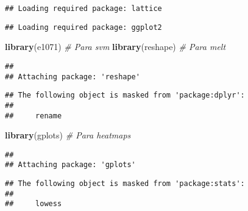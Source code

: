\documentclass[
]{article}
\newenvironment{Shaded}{\begin{snugshade}}{\end{snugshade}}
\newcommand{\CommentTok}[1]{\textcolor[rgb]{0.56,0.35,0.01}{\textit{#1}}}
\newcommand{\KeywordTok}[1]{\textcolor[rgb]{0.13,0.29,0.53}{\textbf{#1}}}
\newcommand{\NormalTok}[1]{#1}
\begin{document}
\begin{verbatim}
## Loading required package: lattice
\end{verbatim}

\begin{verbatim}
## Loading required package: ggplot2
\end{verbatim}

\begin{Shaded}
\begin{Highlighting}[]
\KeywordTok{library}\NormalTok{(e1071)       }\CommentTok{# Para svm}
\KeywordTok{library}\NormalTok{(reshape)     }\CommentTok{# Para melt}
\end{Highlighting}
\end{Shaded}

\begin{verbatim}
## 
## Attaching package: 'reshape'
\end{verbatim}

\begin{verbatim}
## The following object is masked from 'package:dplyr':
## 
##     rename
\end{verbatim}

\begin{Shaded}
\begin{Highlighting}[]
\KeywordTok{library}\NormalTok{(gplots)      }\CommentTok{# Para heatmaps}
\end{Highlighting}
\end{Shaded}

\begin{verbatim}
## 
## Attaching package: 'gplots'
\end{verbatim}

\begin{verbatim}
## The following object is masked from 'package:stats':
## 
##     lowess
\end{verbatim}
\end{document}
